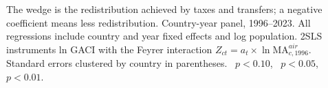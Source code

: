 \begin{table}[H]
\centering
\caption{Mechanism (V): is the effect offset by redistribution?}
\label{tab:mech_E}
\begin{minipage}{\linewidth}
\centering
{}
\par\vspace{3pt}\begin{flushleft}\footnotesize The wedge is the redistribution achieved by taxes and transfers; a negative coefficient means less redistribution. Country-year panel, 1996--2023. All regressions include country and year fixed effects and log population. 2SLS instruments ln GACI with the Feyrer interaction $Z_{ct}=a_t\times\ln \mathrm{MA}^{air}_{c,1996}$. Standard errors clustered by country in parentheses. \sym{*}~$p<0.10$, \sym{**}~$p<0.05$, \sym{***}~$p<0.01$.\end{flushleft}
\end{minipage}
\end{table}
